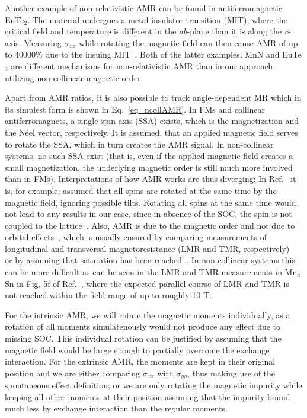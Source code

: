 \documentclass[prb,showpacs,amsmath,amssymb,superscriptaddress,twocolumn,floatfix]{revtex4-1}
\begin{document}
Another example of non-relativistic AMR can be found in antiferromagnetic EuTe$_2$. The material undergoes a metal-insulator transition (MIT), where the critical field and temperature is different in the \textit{ab}-plane than it is along the \textit{c}-axis. Measuring $\sigma_{xx}$ while rotating the magnetic field can then cause AMR of up to $40000\%$ due to the insuing MIT~\cite{Yang:2021}. Both of the latter examples, MnN and EuTe$_2$ are different mechanisms for non-relativistic AMR than in our approach utilizing non-collinear magnetic order.

Apart from AMR ratios, it is also possible to track angle-dependent MR which in its simplest form is shown in Eq.~\ref{eq_ncollAMR}. In FMs and collinear antiferromagnets, a single spin axis (SSA) exists, which is the magnetization and the N\'eel vector, respectively. It is assumed, that an applied magnetic field serves to rotate the SSA, which in turn creates the AMR signal. In non-collinear systems, no such SSA exist (that is, even if the applied magnetic field creates a small magnetization, the underlying magnetic order is still much more involved than in FMs). Interpretations of how AMR works are thus diverging: In Ref.~ it is, for example, assumed that all spins are rotated at the same time by the magnetic field, ignoring possible tilts. Rotating all spins at the same time would not lead to any results in our case, since in absence of the SOC, the spin is not coupled to the lattice~\cite{Gonzalez-Hernandez:2024}. Also, AMR is due to the magnetic order and not due to orbital effects~\cite{Ritzinger:2023}, which is usually ensured by comparing measurements of longitudinal and transversal magnetoresistance (LMR and TMR, respectively)~\cite{Bakonyi:2022} or by assuming that saturation has been reached~\cite{Ritzinger:2021}. In non-collinear systems this can be more difficult as can be seen in the LMR and TMR measurements in Mn$_3$Sn in Fig. 5f of Ref.~, where the expected parallel course of LMR and TMR is not reached within the field range of up to roughly 10 T.

For the intrinsic AMR, we will rotate the magnetic moments individually, as a rotation of all moments simulatenously would not produce any effect due to missing SOC. This individual rotation can be justified by assuming that the magnetic field would be large enough to partially overcome the exchange interaction. For the extrinsic AMR, the moments are kept in their original position and we are either comparing $\sigma_{xx}$ with $\sigma_{yy}$, thus making use of the spontaneous effect definition; or we are only rotating the magnetic impurity while keeping all other moments at their position assuming that the impurity bound much less by exchange interaction than the regular moments. 
\end{document}
